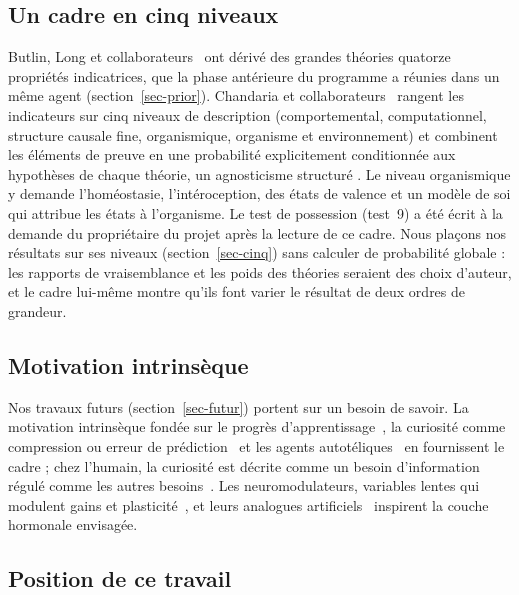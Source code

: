 \documentclass[11pt,a4paper]{article}
\begin{document}
\subsection{Un cadre en cinq niveaux}

Butlin, Long et collaborateurs~\cite{butlin2023} ont dérivé des grandes théories
quatorze propriétés indicatrices, que la phase antérieure du programme a
réunies dans un même agent (section~\ref{sec-prior}). Chandaria et
collaborateurs~\cite{chandaria2026} rangent les indicateurs sur cinq niveaux de
description (comportemental, computationnel, structure causale fine,
organismique, organisme et environnement) et combinent les éléments de preuve en
une probabilité explicitement conditionnée aux hypothèses de chaque théorie, un
\og agnosticisme structuré \fg{}. Le niveau organismique y demande
l'homéostasie, l'intéroception, des états de valence et un modèle de soi qui
attribue les états à l'organisme. Le test de possession (test~9) a été écrit à la
demande du propriétaire du projet après la lecture de ce cadre. Nous plaçons nos
résultats sur ses niveaux (section~\ref{sec-cinq}) sans calculer de probabilité
globale : les rapports de vraisemblance et les poids des théories seraient des
choix d'auteur, et le cadre lui-même montre qu'ils font varier le résultat de
deux ordres de grandeur.

\subsection{Motivation intrinsèque}

Nos travaux futurs (section~\ref{sec-futur}) portent sur un besoin de savoir.
La motivation intrinsèque fondée sur le progrès
d'apprentissage~\cite{oudeyer2007,gottlieb2013,baranes2013}, la curiosité
comme compression ou erreur de prédiction~\cite{schmidhuber1991,schmidhuber2010,pathak2017}
et les agents autotéliques~\cite{colas2022} en fournissent le cadre ; chez
l'humain, la curiosité est décrite comme un besoin d'information régulé
comme les autres besoins~\cite{kidd2015}. Les neuromodulateurs, variables
lentes qui modulent gains et plasticité~\cite{doya2002,yu2005,marder2012}, et
leurs analogues artificiels~\cite{miconi2019,perez2018} inspirent la
\og couche hormonale \fg{} envisagée.

\subsection{Position de ce travail}
\end{document}
